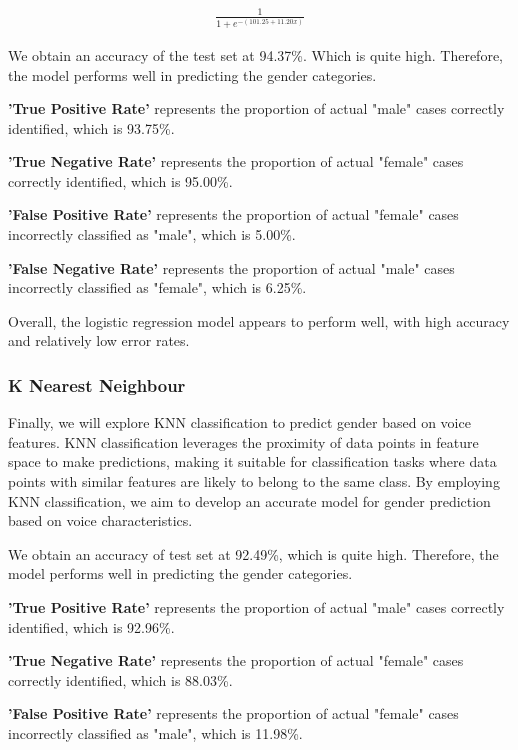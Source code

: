 \documentclass{article}
\begin{document}
	\begin{align*}
		\frac{1}{1+e^{-(101.25+11.20 x)}}
	\end{align*}
	
	We obtain an accuracy of the test set at 94.37\%. Which is quite high. Therefore, the model performs well in predicting the gender categories.
	
	\textbf{'True Positive Rate'} represents the proportion of actual "male" cases correctly identified, which is 93.75\%.
	
	\textbf{'True Negative Rate'} represents the proportion of actual "female" cases correctly identified, which is 95.00\%.
	
	\textbf{'False Positive Rate'} represents the proportion of actual "female" cases incorrectly classified as "male", which is 5.00\%.
	
	\textbf{'False Negative Rate'} represents the proportion of actual "male" cases incorrectly classified as "female", which is 6.25\%.
	
	Overall, the logistic regression model appears to perform well, with high accuracy and relatively low error rates.
	
	\subsubsection{K Nearest Neighbour}
	
	Finally, we will explore KNN classification to predict gender based on voice features. KNN classification leverages the proximity of data points in feature space to make predictions, making it suitable for classification tasks where data points with similar features are likely to belong to the same class. By employing KNN classification, we aim to develop an accurate model for gender prediction based on voice characteristics.
	
	We obtain an accuracy of test set at 92.49\%, which is quite high. Therefore, the model performs well in predicting the gender categories.
	
	\textbf{'True Positive Rate'} represents the proportion of actual "male" cases correctly identified, which is 92.96\%.
	
	\textbf{'True Negative Rate'} represents the proportion of actual "female" cases correctly identified, which is 88.03\%.
	
	\textbf{'False Positive Rate'} represents the proportion of actual "female" cases incorrectly classified as "male", which is 11.98\%.
	
\end{document}
